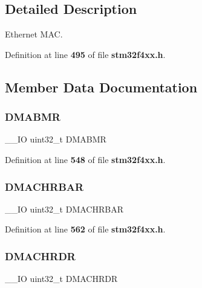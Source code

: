 \subsection{Detailed Description}
Ethernet M\+AC. 

Definition at line \textbf{ 495} of file \textbf{ stm32f4xx.\+h}.



\subsection{Member Data Documentation}
\mbox{\label{structETH__TypeDef_ad1e11eb1200e64e0563e3576bf258194}} 
\subsubsection{D\+M\+A\+B\+MR}
{\footnotesize\ttfamily \+\_\+\+\_\+\+IO uint32\+\_\+t D\+M\+A\+B\+MR}



Definition at line \textbf{ 548} of file \textbf{ stm32f4xx.\+h}.

\mbox{\label{structETH__TypeDef_acf3f7ecbf774d8d505655ac7f24761fc}} 
\subsubsection{D\+M\+A\+C\+H\+R\+B\+AR}
{\footnotesize\ttfamily \+\_\+\+\_\+\+IO uint32\+\_\+t D\+M\+A\+C\+H\+R\+B\+AR}



Definition at line \textbf{ 562} of file \textbf{ stm32f4xx.\+h}.

\mbox{\label{structETH__TypeDef_a9c49de2e699886d6604fd2b3d376a0e9}} 
\subsubsection{D\+M\+A\+C\+H\+R\+DR}
{\footnotesize\ttfamily \+\_\+\+\_\+\+IO uint32\+\_\+t D\+M\+A\+C\+H\+R\+DR}



